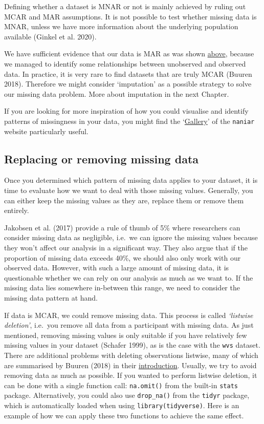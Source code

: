 \documentclass[
  letterpaper,
  DIV=11,
  numbers=noendperiod]{scrreprt}
\begin{document}
Defining whether a dataset is MNAR or not is mainly achieved by ruling
out MCAR and MAR assumptions. It is not possible to test whether missing
data is MNAR, unless we have more information about the underlying
population available (Ginkel et al. 2020).

We have sufficient evidence that our data is MAR as was shown
\hyperref[missing-at-random-mar]{above}, because we managed to identify
some relationships between unobserved and observed data. In practice, it
is very rare to find datasets that are truly MCAR (Buuren 2018).
Therefore we might consider `imputation' as a possible strategy to solve
our missing data problem. More about imputation in the next Chapter.

If you are looking for more inspiration of how you could visualise and
identify patterns of missingness in your data, you might find the
`\href{https://naniar.njtierney.com/articles/naniar-visualisation.html}{Gallery}'
of the \texttt{naniar} website particularly useful.

\subsection{Replacing or removing missing
data}\label{sec-replacing-removing-missing-data}

Once you determined which pattern of missing data applies to your
dataset, it is time to evaluate how we want to deal with those missing
values. Generally, you can either keep the missing values as they are,
replace them or remove them entirely.

Jakobsen et al. (2017) provide a rule of thumb of 5\% where researchers
can consider missing data as negligible, i.e.~we can ignore the missing
values because they won't affect our analysis in a significant way. They
also argue that if the proportion of missing data exceeds 40\%, we
should also only work with our observed data. However, with such a large
amount of missing data, it is questionable whether we can rely on our
analysis as much as we want to. If the missing data lies somewhere
in-between this range, we need to consider the missing data pattern at
hand.

If data is MCAR, we could remove missing data. This process is called
\emph{`listwise deletion'}, i.e.~you remove all data from a participant
with missing data. As just mentioned, removing missing values is only
suitable if you have relatively few missing values in your dataset
(Schafer 1999), as is the case with the \texttt{wvs} dataset. There are
additional problems with deleting observations listwise, many of which
are summarised by Buuren (2018) in their
\href{https://stefvanbuuren.name/fimd/sec-simplesolutions.html}{introduction}.
Usually, we try to avoid removing data as much as possible. If you
wanted to perform listwise deletion, it can be done with a single
function call: \texttt{na.omit()} from the built-in \texttt{stats}
package. Alternatively, you could also use \texttt{drop\_na()} from the
\texttt{tidyr} package, which is automatically loaded when using
\texttt{library(tidyverse)}. Here is an example of how we can apply
these two functions to achieve the same effect.
\end{document}

